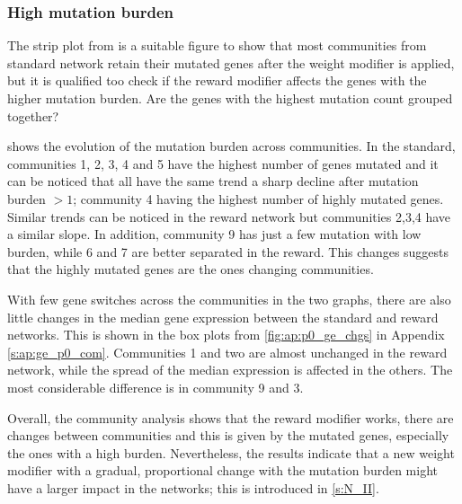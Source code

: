 \subsubsection*{High mutation burden}

The strip plot from  is a suitable figure to show that most communities from standard network retain their mutated genes after the weight modifier is applied, but it is qualified too check if the reward modifier affects the genes with the higher mutation burden. Are the genes with the highest mutation count grouped together?

 shows the evolution of the mutation burden across communities. In the standard, communities 1, 2, 3, 4 and 5 have the highest number of genes mutated and it can be noticed that all have the same trend a sharp decline after mutation burden $>1$; community 4 having the highest number of highly mutated genes. Similar trends can be noticed in the reward network but communities 2,3,4 have a similar slope. In addition, community 9 has just a few mutation with low burden, while 6 and 7 are better separated in the reward. This changes suggests that the highly mutated genes are the ones changing communities.

With few gene switches across the communities in the two graphs, there are also little changes in the median gene expression between the standard and reward networks. This is shown in the box plots from \cref{fig:ap:p0_ge_chgs} in Appendix \cref{s:ap:ge_p0_com}. Communities 1 and two are almost unchanged in the reward network, while the spread of the median expression is affected in the others. The most considerable difference is in community 9 and 3.  

Overall, the community analysis shows that the reward modifier works, there are changes between communities and this is given by the mutated genes, especially the ones with a high burden. Nevertheless, the results indicate that a new weight modifier with a gradual, proportional change with the mutation burden might have a larger impact in the networks; this is introduced in \cref{s:N_II}.

